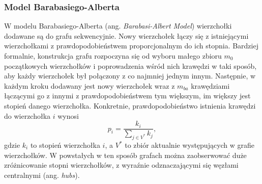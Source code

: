     \subsubsection{Model Barabasiego-Alberta}
    W modelu Barabasiego-Alberta (ang. \emph{Barabasi-Albert Model}) wierzchołki dodawane są do grafu sekwencyjnie. Nowy wierzchołek łączy się z istniejącymi wierzchołkami z prawdopodobieństwem proporcjonalnym do ich stopnia. Bardziej formalnie, konstrukcja grafu rozpoczyna się od wyboru małego zbioru $m_0$ początkowych wierzchołków i poprowadzenia wśród nich krawędzi w taki sposób, aby każdy wierzchołek był połączony z co najmniej jednym innym. Następnie, w każdym kroku dodawany jest nowy wierzchołek wraz z $m_{ba}$ krawędziami łączącymi go z innymi z prawdopodobieństwem tym większym, im większy jest stopień danego wierzchołka. Konkretnie, prawdopodobieństwo istnienia krawędzi do wierzchołka $i$ wynosi 
    \[
        p_i = \frac{k_i}{\sum_{j \in V^{*}} k_j},
    \]
    gdzie $k_i$ to stopień wierzchołka $i$, a $V^{*}$ to zbiór aktualnie występujących w grafie wierzchołków. W powstałych w ten sposób grafach można zaobserwować duże zróżnicowanie stopni wierzchołków, z wyraźnie odznaczającymi się węzłami centralnymi (ang. \emph{hubs}).

